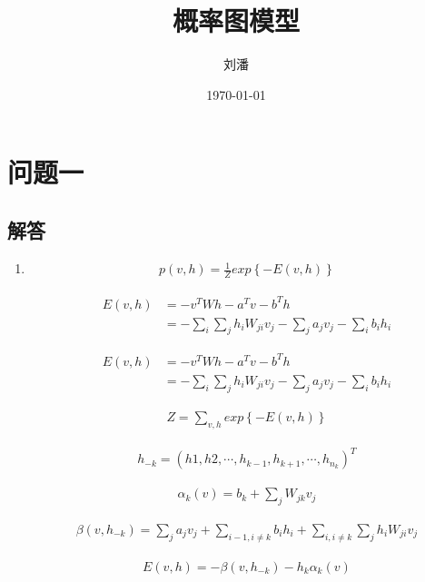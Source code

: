 \documentclass[lang=cn,12pt]{elegantpaper}
\title{概率图模型}
\date{\today}
\author{刘潘}
\begin{document}
\titleN

\section*{问题一}

\subsection*{解答}

\begin{enumerate}
	\item \begin{align}
		p(v,h) = \frac{1}{Z}exp\left\{ -E(v,h) \right\}
	\end{align}
	
	\begin{align}
		E(v,h) & = -v^TWh-a^Tv-b^Th \\
		 & = -\sum_i\sum_jh_iW_{ji}v_j - \sum_ja_jv_j - \sum_ib_ih_i
	\end{align}
	
	\begin{align*}
		E(v,h) & = -v^TWh-a^Tv-b^Th \\
		 & = -\sum_i\sum_jh_iW_{ji}v_j - \sum_ja_jv_j - \sum_ib_ih_i
	\end{align*}
	
	\begin{align*}
		Z = \sum_{v,h}exp \left\{-E(v,h) \right\}
	\end{align*}
	
	\begin{align*}
		h_{-k} = (h1,h2,\cdots,h_{k-1},h_{k+1},\cdots,h_{n_k})^T
	\end{align*}
	
	\begin{align*}
		\alpha_k(v) = b_k + \sum_jW_{jk}v_j
	\end{align*}
	
	\begin{align*}
		\beta(v,h_{-k}) = \sum_ja_jv_j + \sum_{i-1,i\neq k} b_ih_i + \sum_{i,i\neq k} \sum_jh_iW_{ji}v_j 
	\end{align*}
	
	\begin{align*}
		E(v,h) = - \beta(v,h_{-k}) - h_k \alpha_k(v)
	\end{align*}
	

\end{enumerate}
\end{document}
